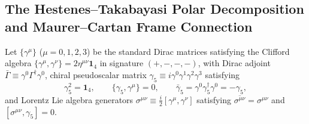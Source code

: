 \documentclass[11pt, a4paper]{article}
\theoremstyle{definition}
\begin{document}
\subsection{The Hestenes--Takabayasi Polar Decomposition and Maurer--Cartan Frame Connection}

Let $\{\gamma^\mu\}$ ($\mu = 0,1,2,3$) be the standard Dirac matrices satisfying the Clifford algebra $\{\gamma^\mu, \gamma^\nu\} = 2\eta^{\mu\nu}\mathbf{1}_4$ in signature $(+,-,-,-)$, with Dirac adjoint $\bar{\Gamma} \equiv \gamma^0 \Gamma^\dagger \gamma^0$, chiral pseudoscalar matrix $\gamma_5 \equiv i\gamma^0\gamma^1\gamma^2\gamma^3$ satisfying
\begin{equation}
\gamma_5^2 = \mathbf{1}_4, \qquad \{\gamma_5, \gamma^\mu\} = 0, \qquad \bar{\gamma}_5 = \gamma^0 \gamma_5^\dagger \gamma^0 = -\gamma_5,
\end{equation}
and Lorentz Lie algebra generators $\sigma^{\mu\nu} \equiv \frac{i}{2}[\gamma^\mu, \gamma^\nu]$ satisfying $\overline{\sigma^{\mu\nu}} = \sigma^{\mu\nu}$ and $[\sigma^{\mu\nu}, \gamma_5] = 0$.
\end{document}
